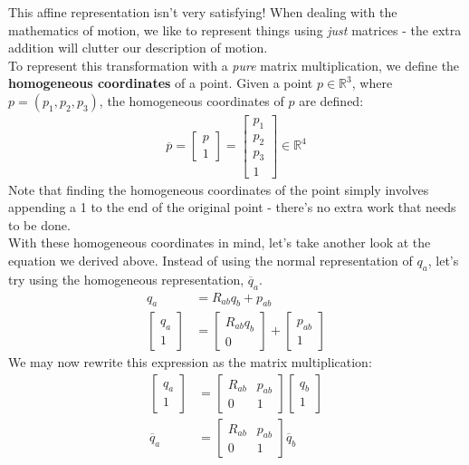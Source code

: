 \documentclass[oneside]{book}
\begin{document}
This affine representation isn't very satisfying! When dealing with the mathematics of motion, we like to represent things using \textit{just} matrices - the extra addition will clutter our description of motion.\\
To represent this transformation with a \textit{pure} matrix multiplication, we define the \textbf{homogeneous coordinates} of a point. Given a point $p\in \mathbb{R}^3$, where $p = (p_1, p_2, p_3)$, the homogeneous coordinates of $p$ are defined:
\begin{align}
    \overline{p} = 
    \begin{bmatrix}
    p\\
    1
    \end{bmatrix}
    = 
    \begin{bmatrix}
    p_1\\
    p_2\\
    p_3\\
    1
    \end{bmatrix} \in \mathbb{R}^4
\end{align}
Note that finding the homogeneous coordinates of the point simply involves appending a 1 to the end of the original point - there's no extra work that needs to be done.\\ 
With these homogeneous coordinates in mind, let's take another look at the equation we derived above. Instead of using the normal representation of $q_a$, let's try using the homogeneous representation, $\overline{q}_a$.
\begin{align}
    q_a &= R_{ab}q_b + p_{ab}\\
    \begin{bmatrix}
    q_a\\
    1
    \end{bmatrix}
    &=
    \begin{bmatrix}
    R_{ab}q_b\\
    0
    \end{bmatrix}
    +
    \begin{bmatrix}
    p_{ab}\\
    1
    \end{bmatrix}
\end{align}
We may now rewrite this expression as the matrix multiplication:
\begin{align}
     \begin{bmatrix}
    q_a\\
    1
    \end{bmatrix}
    &= 
    \begin{bmatrix}
        R_{ab} & p_{ab}\\
        0 & 1
    \end{bmatrix}
    \begin{bmatrix}
        q_b\\
        1
    \end{bmatrix}\\
    \overline{q}_a &= 
    \begin{bmatrix}
        R_{ab} & p_{ab}\\
        0 & 1
    \end{bmatrix}
    \overline{q}_b
\end{align}
\end{document}
